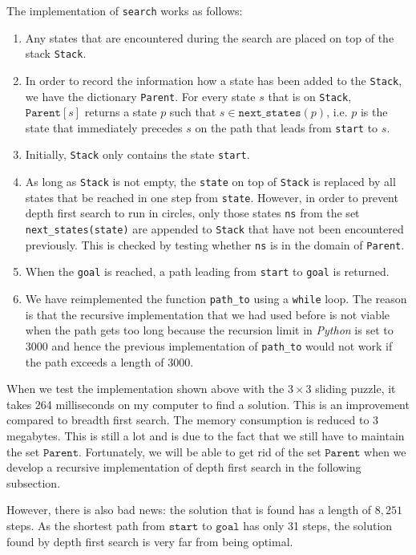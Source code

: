 The implementation of  \texttt{search} works as follows:
\begin{enumerate}
\item Any states that are encountered during the search are placed on top of the stack \texttt{Stack}.
\item In order to record the information how a state has been added to the \texttt{Stack}, we have the dictionary
      \texttt{Parent}.  For every state $s$ that is on \texttt{Stack}, $\texttt{Parent}[s]$ returns a state $p$
      such that $s \in \texttt{next\_states}(p)$,  i.e. $p$ is the state that immediately precedes $s$ on the
      path that leads from \texttt{start} to $s$.  
\item Initially, \texttt{Stack} only contains the state \texttt{start}.
\item As long as \texttt{Stack} is not empty, the \texttt{state} on top of \texttt{Stack} is replaced by all
      states that be reached in one step from \texttt{state}.  However, in order to prevent depth first search
      to run in circles, only those states \texttt{ns} from the set \texttt{next\_states(state)} are appended to
      \texttt{Stack} that have not been encountered previously.  This is checked by testing 
      whether \texttt{ns} is in the domain of \texttt{Parent}.
\item When the \texttt{goal} is reached,  a path leading from \texttt{start} to \texttt{goal} is returned.
\item We have reimplemented the function \texttt{path\_to} using a \texttt{while} loop.  The reason is that 
      the recursive implementation that we had used before is not viable when the path gets too long because
      the recursion limit in \textsl{Python} is set to 3000 and hence the previous implementation of
      \texttt{path\_to} would not work if the path exceeds a length of $3000$.
\end{enumerate}
When we test the implementation shown above with the $3 \times 3$ sliding puzzle, it takes 264 milliseconds 
on my computer to find a solution.  This is an improvement compared to breadth first search.
The memory consumption is reduced to 3 megabytes.  This is still a lot and is due to the fact that we still
have to maintain the set $\texttt{Parent}$.  Fortunately, we will 
be able to get rid of the set $\texttt{Parent}$ when we develop a recursive implementation of depth first
search in the following subsection. 

However, there is also bad news: the solution that is found has a length of $8,251$ steps.  As the
shortest path from $\texttt{start}$ to $\texttt{goal}$ has only 31 steps, the solution found by depth
first search is very far from being optimal.

